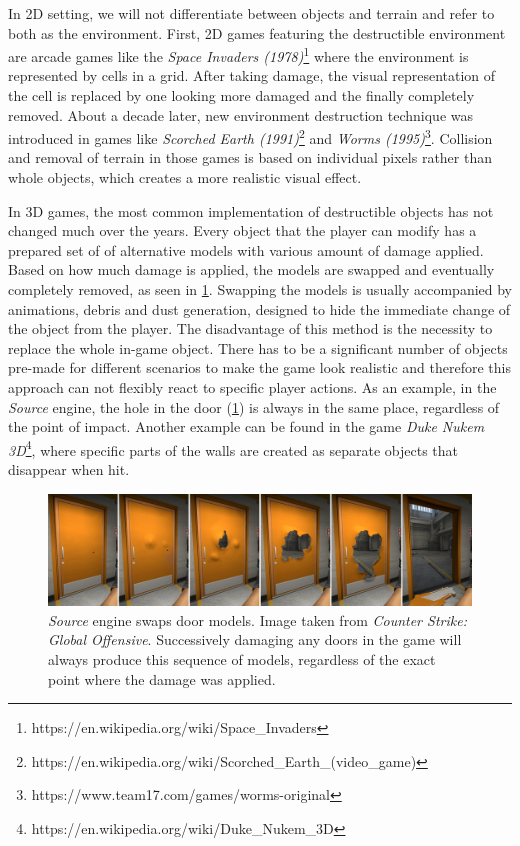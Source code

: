 In 2D setting, we will not differentiate between objects and terrain and refer to both as the environment. 
First, 2D games featuring the destructible environment are arcade games like the \emph{Space Invaders (1978)}\footnote{https://en.wikipedia.org/wiki/Space\_Invaders} where the environment is represented by cells in a grid. After taking damage, the visual representation of the cell is replaced by one looking more damaged and the finally completely removed. About a decade later, new environment destruction technique was introduced in games like \emph{Scorched Earth (1991)}\footnote{https://en.wikipedia.org/wiki/Scorched\_Earth\_(video\_game)} and \emph{Worms (1995)}\footnote{https://www.team17.com/games/worms-original}. Collision and removal of terrain in those games is based on individual pixels rather than whole objects, which creates a more realistic visual effect.

In 3D games, the most common implementation of destructible objects has not changed much over the years. Every object that the player can modify has a prepared set of of alternative models with various amount of damage applied. Based on how much damage is applied, the models are swapped and eventually completely removed, as seen in \cref{fig:doors}. Swapping the models is usually accompanied by animations, debris and dust generation, designed to hide the immediate change of the object from the player. The disadvantage of this method is the necessity to replace the whole in-game object. There has to be a significant number of objects pre-made for different scenarios to make the game look realistic and therefore this approach can not flexibly react to specific player actions. As an example, in the \emph{Source} engine, the hole in the door (\cref{fig:doors}) is always in the same place, regardless of the point of impact. Another example can be found in the game \emph{Duke Nukem 3D}\footnote{https://en.wikipedia.org/wiki/Duke\_Nukem\_3D}, where specific parts of the walls are created as separate objects that disappear when hit.

\begin{figure} 
\centering
\includegraphics[width=\textwidth]{img/doors}
\caption{\emph{Source} engine swaps door models. Image taken from \emph{Counter Strike: Global Offensive}. Successively damaging any doors in the game will always produce this sequence of models, regardless of the exact point where the damage was applied.}
\label{fig:doors}
\end{figure}

